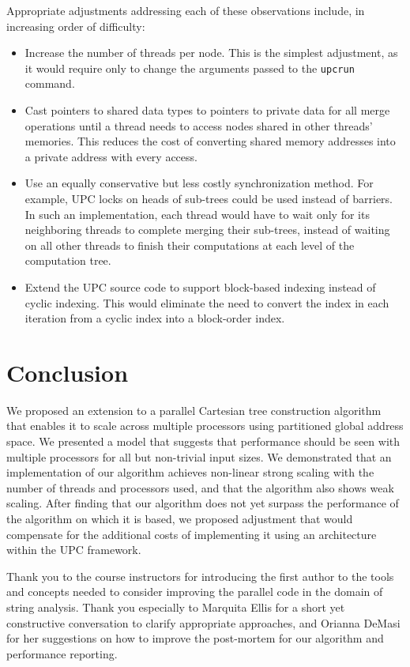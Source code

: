 \documentclass[10pt]{article}
\begin{document}
Appropriate adjustments addressing each of these observations include, in increasing order of
difficulty:
\begin{itemize}
  \item Increase the number of threads per node.  This is the simplest adjustment, as it would
        require only to change the arguments passed to the \texttt{upcrun} command.
  \item Cast pointers to shared data types to pointers to private data for all merge operations
        until a thread needs to access nodes shared in other threads' memories.
        This reduces the cost of converting shared memory addresses into a private address with every
        access.
  \item Use an equally conservative but less costly synchronization method.
        For example, UPC locks on heads of sub-trees could be used instead of barriers.
        In such an implementation, each thread would have to wait only for its neighboring threads
        to complete merging their sub-trees, instead of waiting on all other threads to finish
        their computations at each level of the computation tree.
  \item Extend the UPC source code to support block-based indexing instead of cyclic indexing.
        This would eliminate the need to convert the index in each iteration from a cyclic index
        into a block-order index.
\end{itemize}

\section{Conclusion}

We proposed an extension to a parallel Cartesian tree construction algorithm that enables it to
scale across multiple processors using partitioned global address space.
We presented a model that suggests that performance should be seen with multiple processors 
for all but non-trivial input sizes.
We demonstrated that an implementation of our algorithm achieves non-linear strong scaling with
the number of threads and processors used, and that the algorithm also shows weak scaling.
After finding that our algorithm does not yet surpass the performance of the algorithm on which
it is based, we proposed adjustment that would compensate for the additional costs of implementing
it using an architecture within the UPC framework.

Thank you to the course instructors for introducing the first author to the tools and concepts
needed to consider improving the parallel code in the domain of string analysis.
Thank you especially to Marquita Ellis for a short yet constructive conversation to clarify
appropriate approaches, and Orianna DeMasi for her suggestions on how to improve the post-mortem
for our algorithm and performance reporting.

\printbibliography{}
\end{document}
